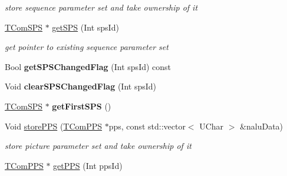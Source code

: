\begin{DoxyCompactItemize}
\begin{DoxyCompactList}\small\item\em store sequence parameter set and take ownership of it \end{DoxyCompactList}\item 
\mbox{\label{class_parameter_set_manager_ac8179c044dcf8081f2e200ccf901b357}} 
\hyperlink{class_t_com_s_p_s}{T\+Com\+S\+PS} $\ast$ \hyperlink{class_parameter_set_manager_ac8179c044dcf8081f2e200ccf901b357}{get\+S\+PS} (Int sps\+Id)
\begin{DoxyCompactList}\small\item\em get pointer to existing sequence parameter set \end{DoxyCompactList}\item 
\mbox{\label{class_parameter_set_manager_a570af47f101435bb0b0f7a73f3f6174b}} 
Bool {\bfseries get\+S\+P\+S\+Changed\+Flag} (Int sps\+Id) const
\item 
\mbox{\label{class_parameter_set_manager_a4a621e3ab9f65606a2156d13b75185b9}} 
Void {\bfseries clear\+S\+P\+S\+Changed\+Flag} (Int sps\+Id)
\item 
\mbox{\label{class_parameter_set_manager_a029484f09b1d327623cba4469bd68cd3}} 
\hyperlink{class_t_com_s_p_s}{T\+Com\+S\+PS} $\ast$ {\bfseries get\+First\+S\+PS} ()
\item 
\mbox{\label{class_parameter_set_manager_a9209bf3d5dd9a67767c613ef2cc9ce88}} 
Void \hyperlink{class_parameter_set_manager_a9209bf3d5dd9a67767c613ef2cc9ce88}{store\+P\+PS} (\hyperlink{class_t_com_p_p_s}{T\+Com\+P\+PS} $\ast$pps, const std\+::vector$<$ U\+Char $>$ \&nalu\+Data)
\begin{DoxyCompactList}\small\item\em store picture parameter set and take ownership of it \end{DoxyCompactList}\item 
\mbox{\label{class_parameter_set_manager_af8f982ee9c0f6899e91e250ad25ac805}} 
\hyperlink{class_t_com_p_p_s}{T\+Com\+P\+PS} $\ast$ \hyperlink{class_parameter_set_manager_af8f982ee9c0f6899e91e250ad25ac805}{get\+P\+PS} (Int pps\+Id)

\end{DoxyCompactItemize}
